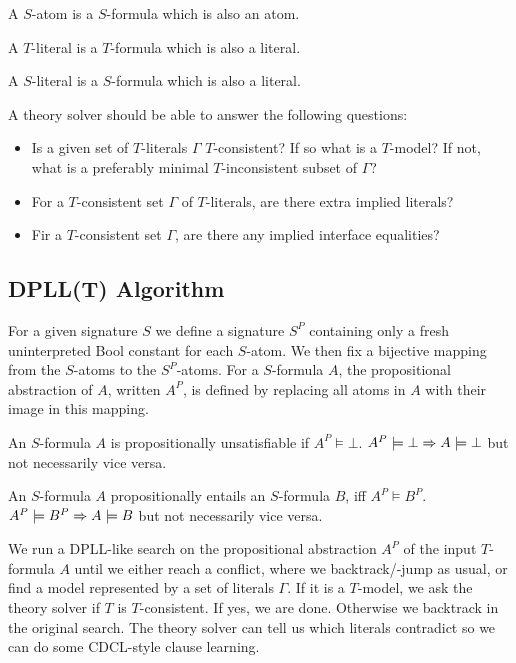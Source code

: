 \begin{mytitle}[$S$-atom] A $S$-atom is a $S$-formula which is also an atom. 
\end{mytitle}
\begin{mytitle}[$T$-literal] A $T$-literal is a $T$-formula which is also a literal.
\end{mytitle}
\begin{mytitle}[$S$-literal] A $S$-literal is a $S$-formula which is also a literal.
\end{mytitle}
\begin{mytitle} A theory solver should be able to answer the following questions:
\begin{itemize}
    \item Is a given set of $T$-literals $\Gamma$ $T$-consistent? If so what is a $T$-model? If not, what is a preferably minimal $T$-inconsistent subset of $\Gamma$?
    \item For a $T$-consistent set $\Gamma$ of $T$-literals, are there extra implied literals?
    \item Fir a $T$-consistent set $\Gamma$, are there any implied interface equalities?
\end{itemize}
\end{mytitle}

\subsection{DPLL(T) Algorithm}
\begin{mytitle} For a given signature $S$ we define a signature $S^P$ containing only a fresh uninterpreted Bool constant for each $S$-atom. We then fix a bijective mapping from the $S$-atoms to the $S^P$-atoms. For a $S$-formula $A$, the propositional abstraction of $A$, written $A^P$, is defined by replacing all atoms in $A$ with their image in this mapping.
\end{mytitle}
\begin{mytitle} An $S$-formula $A$ is propositionally unsatisfiable if $A^P \models \bot$. $A^P\models \bot \Rightarrow A\models \bot$ but not necessarily vice versa.
\end{mytitle}
\begin{mytitle} An $S$-formula $A$ propositionally entails an $S$-formula $B$, iff $A^P \models B^P$. $A^P\models B^P \Rightarrow A\models B$ but not necessarily vice versa.
\end{mytitle}
\begin{mytitle} We run a DPLL-like search on the propositional abstraction $A^P$ of the input $T$-formula $A$ until we either reach a conflict, where we backtrack/-jump as usual, or find a model represented by a set of literals $\Gamma$. If it is a $T$-model, we ask the theory solver if $T$ is $T$-consistent. If yes, we are done. Otherwise we backtrack in the original search. The theory solver can tell us which literals contradict so we can do some CDCL-style clause learning.
\end{mytitle}

